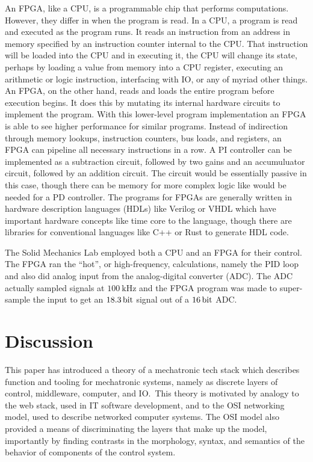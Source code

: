 \documentclass[english,12pt,a4paper,pdftex,eng,utf8]{aaltothesis}
\begin{document}
An FPGA, like a CPU, is a programmable chip that performs computations.  However, they differ in when the program is read.  In a CPU, a program is read and executed as the program runs.  It reads an instruction from an address in memory specified by an instruction counter internal to the CPU.  That instruction will be loaded into the CPU and in executing it, the CPU will change its state, perhaps by loading a value from memory into a CPU register, executing an arithmetic or logic instruction, interfacing with IO, or any of myriad other things.  An FPGA, on the other hand, reads and loads the entire program before execution begins.  It does this by mutating its internal hardware circuits to implement the program.  With this lower-level program implementation an FPGA is able to see higher performance for similar programs.  Instead of indirection through memory lookups, instruction counters, bus loads, and registers, an FPGA can pipeline all necessary instructions in a row.  A PI controller can be implemented as a subtraction circuit, followed by two gains and an accumuluator circuit, followed by an addition circuit.  The circuit would be essentially passive in this case, though there can be memory for more complex logic like would be needed for a PD controller.  The programs for FPGAs are generally written in hardware description languages (HDLs) like Verilog or VHDL which have important hardware concepts like time core to the language, though there are libraries for conventional languages like C++ or Rust to generate HDL code.

The Solid Mechanics Lab employed both a CPU and an FPGA for their control.  The FPGA ran the ``hot'', or high-frequency, calculations, namely the PID loop and also did analog input from the analog-digital converter (ADC).  The ADC actually sampled signals at $\qty{100}{\kilo\hertz}$ and the FPGA program was made to super-sample the input to get an $\qty{18.3}{\bit}$ signal out of a $\qty{16}{\bit}$ ADC.

\clearpage


\section{Discussion}

This paper has introduced a theory of a mechatronic tech stack which describes function and tooling for mechatronic systems, namely as discrete layers of control, middleware, computer, and IO.\  This theory is motivated by analogy to the web stack, used in IT software development, and to the OSI networking model, used to describe networked computer systems.  The OSI model also provided a means of discriminating the layers that make up the model, importantly by finding contrasts in the morphology, syntax, and semantics of the behavior of components of the control system.
\end{document}
